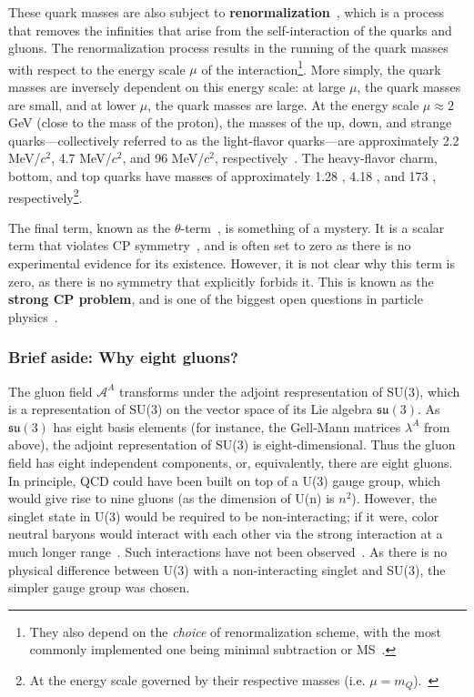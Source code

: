 These quark masses are also subject to \textbf{renormalization}~\cite{MassRenorm}, which is a process that removes the infinities that arise from the self-interaction of the quarks and gluons. The renormalization process results in the running of the quark masses with respect to the energy scale $\mu$ of the interaction\footnote{They also depend on the \textit{choice} of renormalization scheme, with the most commonly implemented one being minimal subtraction or MS~\cite{MSScheme}.}. More simply, the quark masses are inversely dependent on this energy scale: at large $\mu$, the quark masses are small, and at lower $\mu$, the quark masses are large. At the energy scale $\mu \approx 2$ GeV (close to the mass of the proton), the masses of the up, down, and strange quarks---collectively referred to as the light-flavor quarks---are approximately 2.2 MeV/$c^2$, 4.7 MeV/$c^2$, and 96 MeV/$c^2$, respectively~\cite{PDG}. The heavy-flavor charm, bottom, and top quarks have masses of approximately 1.28 \GeVmass, 4.18 \GeVmass, and 173 \GeVmass, respectively\footnote{At the energy scale governed by their respective masses (i.e. $\mu = m_{Q}$).~\cite{PDG}}. 

The final term, known as the $\theta$-term~\cite{ThetaTerm}, is something of a mystery. It is a scalar term that violates CP symmetry~\cite{CPSymmetry}, and is often set to zero as there is no experimental evidence for its existence. However, it is not clear why this term is zero, as there is no symmetry that explicitly forbids it. This is known as the \textbf{strong CP problem}, and is one of the biggest open questions in particle physics~\cite{StrongCPProblem}. 


\subsubsection{Brief aside: Why eight gluons?}
\label{sec:why_eight_gluons}

The gluon field $\mathcal{A}^A$ transforms under the adjoint respresentation of SU(3), which is a representation of SU(3) on the vector space of its Lie algebra $\mathfrak{su}(3)$. As $\mathfrak{su}(3)$ has eight basis elements (for instance, the Gell-Mann matrices $\lambda^A$ from above), the adjoint representation of SU(3) is eight-dimensional. Thus the gluon field has eight independent components, or, equivalently, there are eight gluons. In principle, QCD could have been built on top of a U(3) gauge group, which would give rise to nine gluons (as the dimension of U(n) is $n^2$). However, the singlet state in U(3) would be required to be non-interacting; if it were, color neutral baryons would interact with each other via the strong interaction at a much longer range~\cite{SingletGluons}. Such interactions have not been observed~\cite{SingletGluons2}. As there is no physical difference between U(3) with a non-interacting singlet and SU(3), the simpler gauge group was chosen. 


